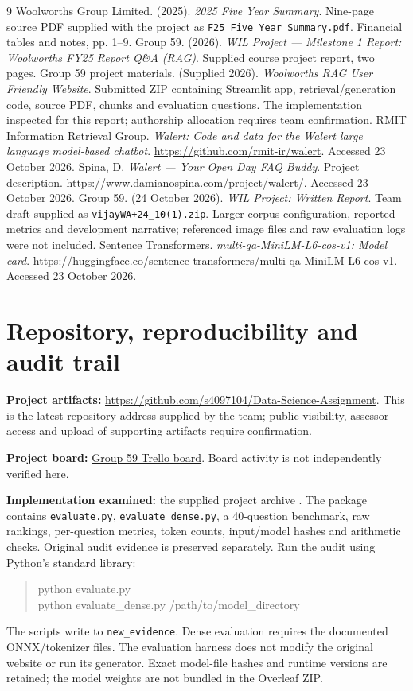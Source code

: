\documentclass[11pt,a4paper]{article}
\begin{document}
\begin{thebibliography}{9}
 Woolworths Group Limited. (2025). \textit{2025 Five Year Summary}. Nine-page source PDF supplied with the project as \texttt{F25\_Five\_Year\_Summary.pdf}. Financial tables and notes, pp. 1--9.
 Group 59. (2026). \textit{WIL Project --- Milestone 1 Report: Woolworths FY25 Report Q\&A (RAG)}. Supplied course project report, two pages.
 Group 59 project materials. (Supplied 2026). \textit{Woolworths RAG User Friendly Website}. Submitted ZIP containing Streamlit app, retrieval/generation code, source PDF, chunks and evaluation questions. The implementation inspected for this report; authorship allocation requires team confirmation.
 RMIT Information Retrieval Group. \textit{Walert: Code and data for the Walert large language model-based chatbot}. \url{https://github.com/rmit-ir/walert}. Accessed 23 October 2026.
 Spina, D. \textit{Walert --- Your Open Day FAQ Buddy}. Project description. \url{https://www.damianospina.com/project/walert/}. Accessed 23 October 2026.
 Group 59. (24 October 2026). \textit{WIL Project: Written Report}. Team draft supplied as \texttt{vijayWA+24\_10(1).zip}. Larger-corpus configuration, reported metrics and development narrative; referenced image files and raw evaluation logs were not included.
 Sentence Transformers. \textit{multi-qa-MiniLM-L6-cos-v1: Model card}. \url{https://huggingface.co/sentence-transformers/multi-qa-MiniLM-L6-cos-v1}. Accessed 23 October 2026.
\end{thebibliography}

\appendix
\section{Repository, reproducibility and audit trail}
\textbf{Project artifacts:} \url{https://github.com/s4097104/Data-Science-Assignment}. This is the latest repository address supplied by the team; public visibility, assessor access and upload of supporting artifacts require confirmation.

\textbf{Project board:} \href{https://trello.com/b/8Gf3ZILx/wil-project-group-59}{Group 59 Trello board}. Board activity is not independently verified here.

\textbf{Implementation examined:} the supplied project archive \cite{prototype}. The package contains \texttt{evaluate.py}, \texttt{evaluate\_dense.py}, a 40-question benchmark, raw rankings, per-question metrics, token counts, input/model hashes and arithmetic checks. Original audit evidence is preserved separately. Run the audit using Python's standard library:
\begin{quote}\small\ttfamily
python evaluate.py\\
python evaluate\_dense.py /path/to/model\_directory
\end{quote}
The scripts write to \texttt{new\_evidence}. Dense evaluation requires the documented ONNX/tokenizer files. The evaluation harness does not modify the original website or run its generator. Exact model-file hashes and runtime versions are retained; the model weights are not bundled in the Overleaf ZIP.
\end{document}
